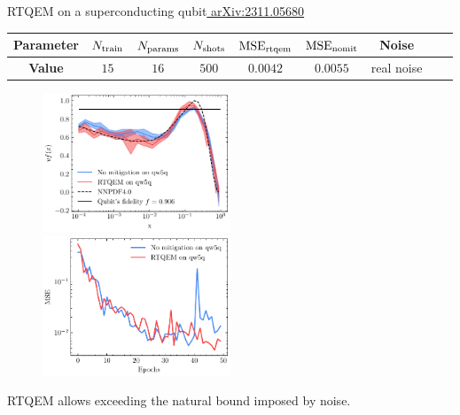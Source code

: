 \documentclass[8pt, xcolor={svgnames}, hyperref={linkcolor=black}]{beamer}
\begin{document}
\begin{frame}{RTQEM on a superconducting qubit\hfill \href{https://arxiv.org/abs/2311.05680}{\faBook\,\,arXiv:2311.05680}}
\begin{center}
\footnotesize
\begin{tabular}{ccccccccc}
\hline \hline 
\rule{0pt}{2.5ex}
\textbf{Parameter} & $N_{\rm train}$ & $N_{\rm params}$ & $N_{\rm shots}$ & $\text{MSE}_{\rm rtqem}$ &  $\text{MSE}_{\rm nomit}$ 
& Noise \\
\hline
\rule{0pt}{2.5ex}
\textbf{Value} & $15$ & $16$ & $500$ & $0.0042$ & $0.0055$ & real noise\\
\hline \hline 
\end{tabular}
\end{center}

\begin{figure}
    \includegraphics[width=0.5\textwidth]{figures/qw5q_short.pdf}%
    \includegraphics[width=0.5\textwidth]{figures/losses_qw5q.pdf}
\end{figure}
\vspace{0.4cm}
\centering
RTQEM allows exceeding the natural bound imposed by noise.
\end{frame}
\end{document}
